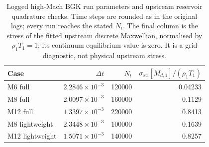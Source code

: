 \documentclass[lineno,paper]{JFM-FLM_Au}
\newcommand{\revisionbox}[1]{\colorbox{revisionyellow}{#1}}
\newcommand{\revisionbox}[1]{#1}
\begin{document}
\begin{table}
\centering
\revisionbox{\begin{minipage}{0.92\textwidth}\captionsetup{width=\linewidth}
\caption{Logged high-Mach BGK run parameters and upstream reservoir quadrature checks. Time steps are rounded as in the original logs; every run reaches the stated $N_t$. The final column is the stress of the fitted upstream discrete Maxwellian, normalised by $\rho_1T_1=1$; its continuum equilibrium value is zero. It is a grid diagnostic, not physical upstream stress.}
\label{tab:high_mach_run_audit}
\centering\small
\begin{tabular}{lrrr}
\toprule
Case & $\Delta t$ & $N_t$ & $\sigma_{xx}[M_{d,1}]/(\rho_1T_1)$\\
\midrule
M6 full & $2.2846\times10^{-3}$ & 120000 & 0.04233\\
M8 full & $2.0097\times10^{-3}$ & 160000 & 0.1129\\
M12 full & $1.3397\times10^{-3}$ & 220000 & 0.8413\\
M8 lightweight & $2.3448\times10^{-3}$ & 100000 & 0.1639\\
M12 lightweight & $1.5071\times10^{-3}$ & 140000 & 0.8257\\
\bottomrule
\end{tabular}
\end{minipage}}\par
\end{table}
\end{document}

